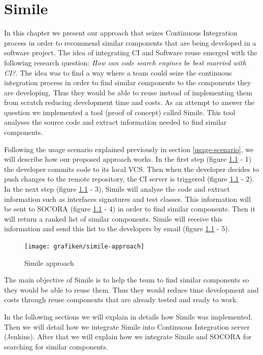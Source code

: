 \chapter{Simile}
\label{chap:simile}
In this chapter we present our approach that seizes Continuous Integration process in order to recommend similar components that are being developed in a software project. The idea of integrating CI and Software reuse emerged with the following research question: \emph{How can code search engines be best married with CI?}. The idea was to find a way where a team could seize the continuous integration process in order to find similar components to the components they are developing. Thus they would be able to reuse instead of implementing them from scratch reducing development time and costs. As an attempt to answer the question we implemented a tool (proof of concept) called Simile. This tool analyses the source code and extract information needed to find similar components.

Following the usage scenario explained previously in section \ref{usage-scenario}, we will describe how our proposed approach works. In the first step (figure \ref{fig:simile-01} - 1) the developer commits code to its local VCS. Then when the developer decides to push changes to the remote repository, the CI server is triggered (figure \ref{fig:simile-01} - 2). In the next step (figure \ref{fig:simile-01} - 3), Simile will analyse the code and extract information such as interfaces signatures and test classes. This information will be sent to SOCORA (figure \ref{fig:simile-01} - 4) in order to find similar components. Then it will return a ranked list of similar components. Simile will receive this information and send this list to the developers by email (figure \ref{fig:simile-01} - 5).

\begin{figure}[H]
	\centering
    \texttt{[image: grafiken/simile-approach]}
    \caption{Simile approach}
    \label{fig:simile-01}
\end{figure}

The main objective of Simile is to help the team to find similar components so they would be able to reuse them. Thus they would reduce time development and costs through reuse components that are already tested and ready to work.

In the following sections we will explain in details how Simile was implemented. Then we will detail how we integrate Simile into Continuous Integration server (Jenkins). After that we will explain how we integrate Simile and SOCORA for searching for similar components.


